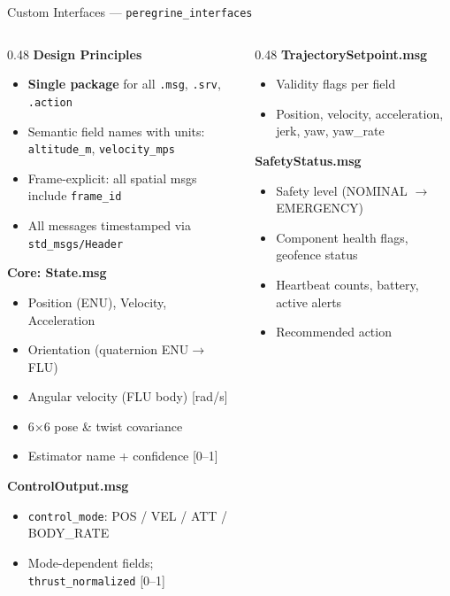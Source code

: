 \documentclass[aspectratio=169, 10pt]{beamer}
\begin{document}
\begin{frame}{Custom Interfaces --- \texttt{peregrine\_interfaces}}
\begin{columns}[T]
\begin{column}{0.48\textwidth}
\textbf{Design Principles}
\begin{itemize}\scriptsize
  \item \textbf{Single package} for all \texttt{.msg}, \texttt{.srv}, \texttt{.action}
  \item Semantic field names with units: \texttt{altitude\_m}, \texttt{velocity\_mps}
  \item Frame-explicit: all spatial msgs include \texttt{frame\_id}
  \item All messages timestamped via \texttt{std\_msgs/Header}
\end{itemize}

\vspace{0.3em}
\textbf{Core: State.msg}
\begin{itemize}\scriptsize
  \item Position (ENU), Velocity, Acceleration
  \item Orientation (quaternion ENU$\to$FLU)
  \item Angular velocity (FLU body) [rad/s]
  \item 6$\times$6 pose \& twist covariance
  \item Estimator name + confidence [0--1]
\end{itemize}

\vspace{0.3em}
\textbf{ControlOutput.msg}
\begin{itemize}\scriptsize
  \item \texttt{control\_mode}: POS / VEL / ATT / BODY\_RATE
  \item Mode-dependent fields; \texttt{thrust\_normalized} [0--1]
\end{itemize}
\end{column}

\begin{column}{0.48\textwidth}
\textbf{TrajectorySetpoint.msg}
\begin{itemize}\scriptsize
  \item Validity flags per field
  \item Position, velocity, acceleration, jerk, yaw, yaw\_rate
\end{itemize}

\vspace{0.2em}
\textbf{SafetyStatus.msg}
\begin{itemize}\scriptsize
  \item Safety level (NOMINAL $\to$ EMERGENCY)
  \item Component health flags, geofence status
  \item Heartbeat counts, battery, active alerts
  \item Recommended action
\end{itemize}


\end{column}
\end{columns}
\end{frame}
\end{document}
